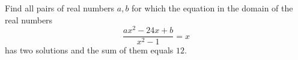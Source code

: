 Find all pairs of real numbers $a, b$ for which the equation in the domain of the real numbers
\[\frac{ax^2-24x+b}{x^2-1}=x\]
has two solutions and the sum of them equals $12$.